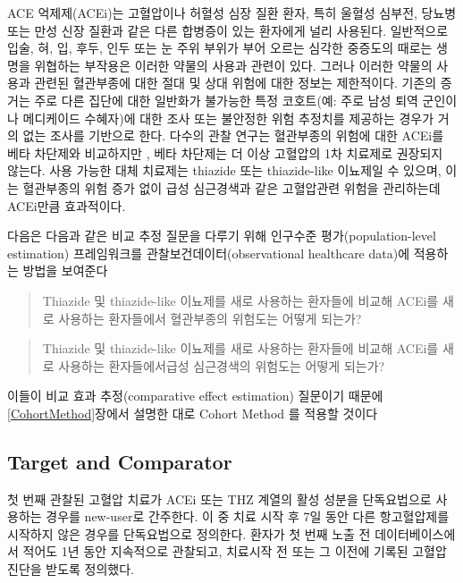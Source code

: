\documentclass[11pt]{book}
\theoremstyle{definition}
\theoremstyle{definition}
\theoremstyle{definition}
\theoremstyle{remark}
\begin{document}
ACE 억제제(ACEi)는 고혈압이나 허혈성 심장 질환 환자, 특히 울혈성 심부전,
당뇨병 또는 만성 신장 질환과 같은 다른 합병증이 있는 환자에게 널리
사용된다. \citep{zaman_2002} 일반적으로 입술, 혀, 입, 후두, 인두 또는 눈
주위 부위가 부어 오르는 심각한 중증도의 때로는 생명을 위협하는 부작용은
이러한 약물의 사용과 관련이 있다. \citep{sabroe_1997} 그러나 이러한
약물의 사용과 관련된 혈관부종에 대한 절대 및 상대 위험에 대한 정보는
제한적이다. 기존의 증거는 주로 다른 집단에 대한 일반화가 불가능한 특정
코호트(예: 주로 남성 퇴역 군인이나 메디케이드 수혜자)에 대한 조사 또는
불안정한 위험 추정치를 제공하는 경우가 거의 없는 조사를 기반으로 한다.
\citep{powers_2012} 다수의 관찰 연구는 혈관부종의 위험에 대한 ACEi를
베타 차단제와 비교하지만 \citep{magid_2010, toh_2012}, 베타 차단제는 더
이상 고혈압의 1차 치료제로 권장되지 않는다. \citep{whelton_2018} 사용
가능한 대체 치료제는 thiazide 또는 thiazide-like 이뇨제일 수 있으며,
이는 혈관부종의 위험 증가 없이 급성 심근경색과 같은 고혈압관련 위험을
관리하는데 ACEi만큼 효과적이다.

다음은 다음과 같은 비교 추정 질문을 다루기 위해 인구수준
평가(population-level estimation) 프레임워크를
관찰보건데이터(observational healthcare data)에 적용하는 방법을 보여준다

\begin{quote}
Thiazide 및 thiazide-like 이뇨제를 새로 사용하는 환자들에 비교해 ACEi를
새로 사용하는 환자들에서 혈관부종의 위험도는 어떻게 되는가?
\end{quote}

\begin{quote}
Thiazide 및 thiazide-like 이뇨제를 새로 사용하는 환자들에 비교해 ACEi를
새로 사용하는 환자들에서급성 심근경색의 위험도는 어떻게 되는가?
\end{quote}

이들이 비교 효과 추정(comparative effect estimation) 질문이기 때문에
\ref{CohortMethod}장에서 설명한 대로 Cohort Method 를 적용할 것이다

\subsection{Target and Comparator}\label{target-and-comparator}

첫 번째 관찰된 고혈압 치료가 ACEi 또는 THZ 계열의 활성 성분을
단독요법으로 사용하는 경우를 new-user로 간주한다. 이 중 치료 시작 후 7일
동안 다른 항고혈압제를 시작하지 않은 경우를 단독요법으로 정의한다.
환자가 첫 번째 노출 전 데이터베이스에서 적어도 1년 동안 지속적으로
관찰되고, 치료시작 전 또는 그 이전에 기록된 고혈압 진단을 받도록
정의했다.
\end{document}
